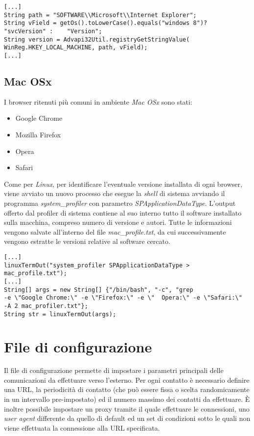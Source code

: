 \vspace{0.5cm}
\begin{lstlisting}
[...]
String path = "SOFTWARE\\Microsoft\\Internet Explorer";
String vField = getOs().toLowerCase().equals("windows 8")? "svcVersion" : 	 "Version";
String version = Advapi32Util.registryGetStringValue(   
WinReg.HKEY_LOCAL_MACHINE, path, vField);
[...]
\end{lstlisting}

\subsection{Mac OSx}
I browser ritenuti pi\`{u} comuni in ambiente \textit{Mac OSx} sono stati:
\begin{itemize}
	\item Google Chrome
	\item Mozilla Firefox
	\item Opera
	\item Safari
\end{itemize}
Come per \textit{Linux}, per identificare l'eventuale versione installata di ogni browser, viene avviato un nuovo processo che esegue la \textit{shell} di sistema avviando il programma \textit{system\_profiler} con parametro \textit{SPApplicationDataType}. L'output offerto dal profiler di sistema contiene al suo interno tutto il software installato sulla macchina, compreso numero di versione e autori. 
Tutte le informazioni vengono salvate all'interno del file \textit{mac\_profile.txt}, da cui successivamente vengono estratte le versioni relative al software cercato.

\vspace{0.5cm}
\begin{lstlisting}
[...]
linuxTermOut("system_profiler SPApplicationDataType > mac_profile.txt");
[...]
String[] args = new String[] {"/bin/bash", "-c", "grep 
-e \"Google Chrome:\" -e \"Firefox:\" -e \"  Opera:\" -e \"Safari:\" 
-A 2 mac_profiler.txt"};
String str = linuxTermOut(args);
\end{lstlisting}

\section{File di configurazione}
Il file di configurazione permette di impostare i parametri principali delle comunicazioni da effettuare verso l'esterno.
Per ogni contatto \`{e} necessario definire una URL, la periodicit\`{a} di contatto (che pu\`{o} essere fissa o scelta randomicamente in un intervallo pre-impostato) ed il numero massimo dei contatti da effettuare.
\`{E} inoltre possibile impostare un proxy tramite il quale effettuare le connessioni, uno \textit{user agent} differente da quello di default ed un set di condizioni sotto le quali non viene effettuata la connessione alla URL specificata.

